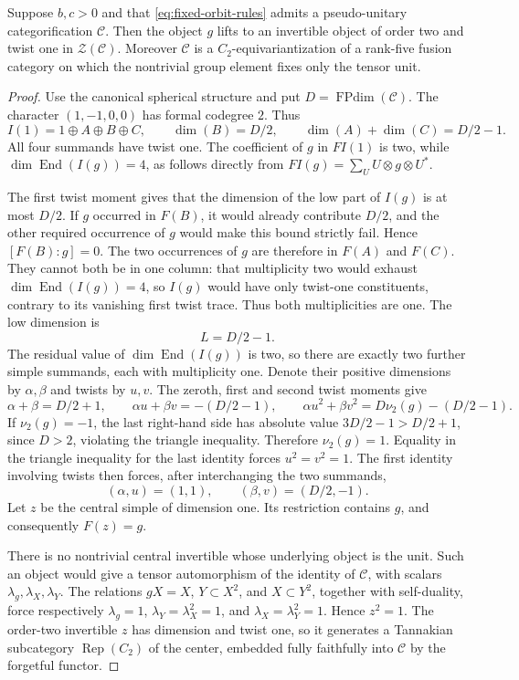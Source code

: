 \begin{proposition}\label{prop:fixed-orbits-boson}
Suppose $b,c>0$ and that \eqref{eq:fixed-orbit-rules} admits a
pseudo-unitary categorification $\mathcal C$. Then the object $g$ lifts
to an invertible object of order two and twist one in $\mathcal Z(\mathcal C)$.
Moreover $\mathcal C$ is a $C_2$-equivariantization of a rank-five fusion
category on which the nontrivial group element fixes only the tensor unit.
\end{proposition}
\begin{proof}
Use the canonical spherical structure and put $D=\operatorname{FPdim}(\mathcal C)$.
The character $(1,-1,0,0)$ has formal codegree $2$. Thus
\[
 I(1)=1\oplus A\oplus B\oplus C,
 \qquad \dim(B)=D/2,
 \qquad \dim(A)+\dim(C)=D/2-1.
\]
All four summands have twist one. The coefficient of $g$ in $FI(1)$ is
two, while $\dim\operatorname{End}(I(g))=4$, as follows directly from
$FI(g)=\sum_U U\otimes g\otimes U^*$.

The first twist moment gives that the dimension of the low part of $I(g)$
is at most $D/2$. If $g$ occurred in $F(B)$, it would already contribute
$D/2$, and the other required occurrence of $g$ would make this bound
strictly fail. Hence $[F(B):g]=0$. The two occurrences of $g$ are therefore
in $F(A)$ and $F(C)$. They cannot both be in one column: that multiplicity
two would exhaust $\dim\operatorname{End}(I(g))=4$, so $I(g)$ would have
only twist-one constituents, contrary to its vanishing first twist trace.
Thus both multiplicities are one. The low dimension is
\[
 L=D/2-1.
\]
The residual value of $\dim\operatorname{End}(I(g))$ is two, so there
are exactly two further simple summands, each with multiplicity one.
Denote their positive dimensions by $\alpha,\beta$ and twists by $u,v$.
The zeroth, first and second twist moments give
\[
 \alpha+\beta=D/2+1,\qquad
 \alpha u+\beta v=-(D/2-1),\qquad
 \alpha u^2+\beta v^2=D\nu_2(g)-(D/2-1).
\]
If $\nu_2(g)=-1$, the last right-hand side has absolute value
$3D/2-1>D/2+1$, since $D>2$, violating the triangle inequality.
Therefore $\nu_2(g)=1$. Equality in the triangle inequality for the last
identity forces $u^2=v^2=1$. The first identity involving twists then
forces, after interchanging the two summands,
\[
 (\alpha,u)=(1,1),\qquad (\beta,v)=(D/2,-1).
\]
Let $z$ be the central simple of dimension one. Its restriction contains
$g$, and consequently $F(z)=g$.

There is no nontrivial central invertible whose underlying object is the
unit. Such an object would give a tensor automorphism of the identity of
$\mathcal C$, with scalars $\lambda_g,\lambda_X,\lambda_Y$.
The relations $gX=X$, $Y\subset X^2$, and $X\subset Y^2$, together with
self-duality, force respectively
$\lambda_g=1$, $\lambda_Y=\lambda_X^2=1$, and
$\lambda_X=\lambda_Y^2=1$. Hence $z^2=1$.
The order-two invertible $z$ has dimension and twist one, so it generates
a Tannakian subcategory $\operatorname{Rep}(C_2)$ of the center, embedded
fully faithfully into $\mathcal C$ by the forgetful functor.


\end{proof}
